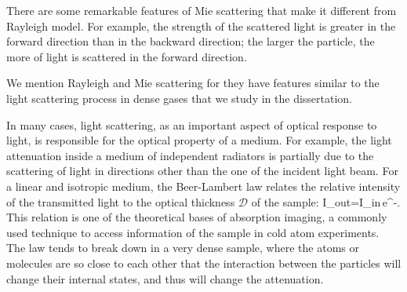 There are some remarkable features of Mie scattering that make it different from Rayleigh model. For example, the strength of the scattered light is greater in the forward direction than in the backward direction; the larger the particle, the more of light is scattered in the forward direction. 

We mention Rayleigh and Mie scattering for they have features similar to the light scattering process in dense gases that we study in the dissertation.


In many cases, light scattering, as an important aspect of optical response to light, is responsible for the optical property of a medium. For example, the light attenuation inside a medium of independent radiators is partially due to the scattering of light in directions other than the one of the incident light beam. For a linear and isotropic medium, the Beer-Lambert law relates the relative intensity of the transmitted light to the optical thickness $\mathcal{D}$ of the sample:
\bea
I_{out}=I_{in}\,e^{-}.
\label{BEER'S_LAW}
\eea
This relation is one of the theoretical bases of absorption imaging, a commonly used technique to access information of the sample in cold atom experiments. The law tends to break down in a very dense sample, where the atoms or molecules are so close to each other that the interaction between the particles will change their internal states, and thus will change the attenuation. 







